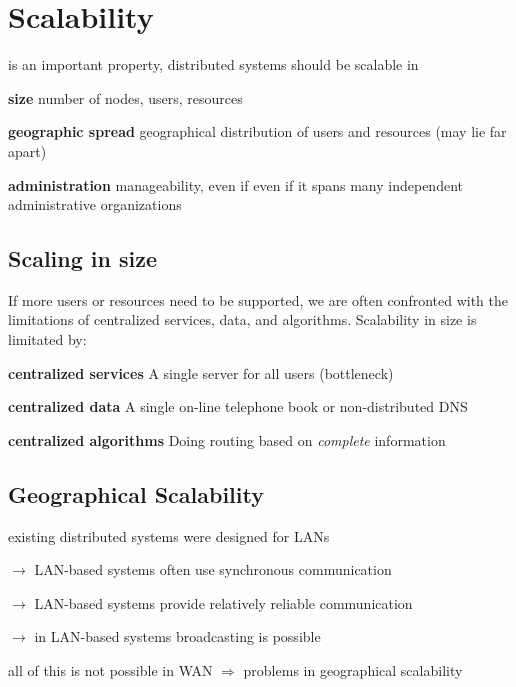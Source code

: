 \documentclass[ngerman,a4paper]{report}
\begin{document}
\section{Scalability} 
is an important property, distributed systems should be scalable in \\
\begin{compactitem}
\item[\textbf{size}] number of nodes, users, resources
\item[\textbf{geographic spread}] geographical distribution of users and resources (may lie far apart)
\item[\textbf{administration}] manageability, even if even if it spans many independent administrative organizations
\end{compactitem}

\subsection{Scaling in size}
If more users or resources need to be supported, we are often confronted with the limitations of centralized services, data, and algorithms. Scalability in size is limitated by:
\begin{compactitem}
\item [\textbf{centralized services}] A single server for all users (bottleneck)
\item [\textbf{centralized data}] A single on-line telephone book or non-distributed DNS
\item [\textbf{centralized algorithms}] Doing routing based on \emph{complete} information
\end{compactitem}
\subsection{Geographical Scalability}
\begin{compactitem}
\item existing distributed systems were designed for LANs
\item $\rightarrow$ LAN-based systems often use synchronous communication 
\item $\rightarrow$ LAN-based systems provide relatively reliable communication
\item $\rightarrow$ in LAN-based systems broadcasting is possible
\item all of this is not possible in WAN $\Rightarrow$ problems in geographical scalability
\end{compactitem}
\end{document}
